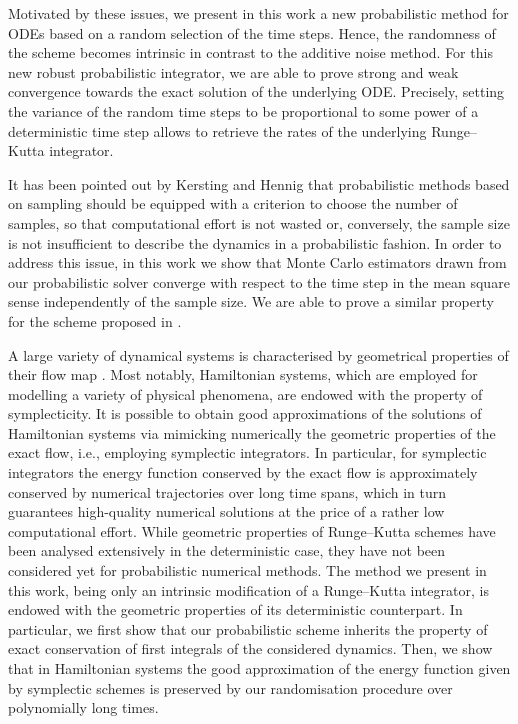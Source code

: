 \documentclass[10pt]{article}
\begin{document}
Motivated by these issues, we present in this work a new probabilistic method for ODEs based on a random selection of the time steps. Hence, the randomness of the scheme becomes intrinsic in contrast to the additive noise method. For this new robust probabilistic integrator, we are able to prove strong and weak convergence towards the exact solution of the underlying ODE. Precisely, setting the variance of the random time steps to be proportional to some power of a deterministic time step allows to retrieve the rates of the underlying Runge--Kutta integrator.

It has been pointed out by Kersting and Hennig \cite{KeH16} that probabilistic methods based on sampling should be equipped with a criterion to choose the number of samples, so that computational effort is not wasted or, conversely, the sample size is not insufficient to describe the dynamics in a probabilistic fashion. In order to address this issue, in this work we show that Monte Carlo estimators drawn from our probabilistic solver converge with respect to the time step in the mean square sense independently of the sample size. We are able to prove a similar property for the scheme proposed in \cite{CGS16}.

A large variety of dynamical systems is characterised by geometrical properties of their flow map \cite{HLW06}. Most notably, Hamiltonian systems, which are employed for modelling a variety of physical phenomena, are endowed with the property of symplecticity. It is possible to obtain good approximations of the solutions of Hamiltonian systems via mimicking numerically the geometric properties of the exact flow, i.e., employing symplectic integrators. In particular, for symplectic integrators the energy function conserved by the exact flow is approximately conserved by numerical trajectories over long time spans, which in turn guarantees high-quality numerical solutions at the price of a rather low computational effort. While geometric properties of Runge--Kutta schemes have been analysed extensively in the deterministic case, they have not been considered yet for probabilistic numerical methods. The method we present in this work, being only an intrinsic modification of a Runge--Kutta integrator, is endowed with the geometric properties of its deterministic counterpart. In particular, we first show that our probabilistic scheme inherits the property of exact conservation of first integrals of the considered dynamics. Then, we show that in Hamiltonian systems the good approximation of the energy function given by symplectic schemes is preserved by our randomisation procedure over polynomially long times.
\end{document}
